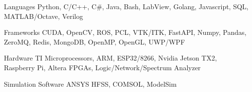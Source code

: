 


\begin{cvskills}

\cvskill
{Languages} %
{Python, C/C++, C\#, Java, Bash, LabView, Golang, Javascript, SQL, MATLAB/Octave, Verilog} %


\cvskill
{Frameworks} %
{CUDA, OpenCV, ROS, PCL, VTK/ITK, FastAPI, Numpy, Pandas, ZeroMQ, Redis, MongoDB, OpenMP, OpenGL, UWP/WPF} %

\cvskill
{Hardware} %
{TI Microprocessors, ARM, ESP32/8266, Nvidia Jetson TX2, Raspberry Pi, Altera FPGAs, Logic/Network/Spectrum Analyzer}

\cvskill
{Simulation Software} %
{ANSYS HFSS, COMSOL, ModelSim}




\end{cvskills}